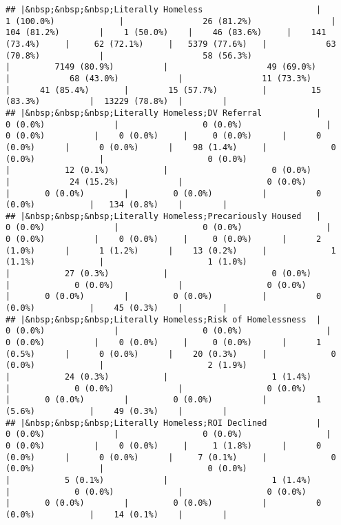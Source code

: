 \documentclass[
]{article}
\begin{document}
\begin{verbatim}
## |&nbsp;&nbsp;&nbsp;Literally Homeless                       |             1 (100.0%)             |                26 (81.2%)                |        104 (81.2%)        |    1 (50.0%)    |    46 (83.6%)     |    141 (73.4%)     |     62 (72.1%)     |   5379 (77.6%)   |            63 (70.8%)            |                    58 (56.3%)                    |         7149 (80.9%)          |                    49 (69.0%)                     |            68 (43.0%)            |                11 (73.3%)                 |      41 (85.4%)       |        15 (57.7%)         |         15 (83.3%)          |  13229 (78.8%)  |        |
## |&nbsp;&nbsp;&nbsp;Literally Homeless;DV Referral           |              0 (0.0%)              |                 0 (0.0%)                 |         0 (0.0%)          |    0 (0.0%)     |     0 (0.0%)      |      0 (0.0%)      |      0 (0.0%)      |    98 (1.4%)     |             0 (0.0%)             |                     0 (0.0%)                     |           12 (0.1%)           |                     0 (0.0%)                      |            24 (15.2%)            |                 0 (0.0%)                  |       0 (0.0%)        |         0 (0.0%)          |          0 (0.0%)           |   134 (0.8%)    |        |
## |&nbsp;&nbsp;&nbsp;Literally Homeless;Precariously Housed   |              0 (0.0%)              |                 0 (0.0%)                 |         0 (0.0%)          |    0 (0.0%)     |     0 (0.0%)      |      2 (1.0%)      |      1 (1.2%)      |    13 (0.2%)     |             1 (1.1%)             |                     1 (1.0%)                     |           27 (0.3%)           |                     0 (0.0%)                      |             0 (0.0%)             |                 0 (0.0%)                  |       0 (0.0%)        |         0 (0.0%)          |          0 (0.0%)           |    45 (0.3%)    |        |
## |&nbsp;&nbsp;&nbsp;Literally Homeless;Risk of Homelessness  |              0 (0.0%)              |                 0 (0.0%)                 |         0 (0.0%)          |    0 (0.0%)     |     0 (0.0%)      |      1 (0.5%)      |      0 (0.0%)      |    20 (0.3%)     |             0 (0.0%)             |                     2 (1.9%)                     |           24 (0.3%)           |                     1 (1.4%)                      |             0 (0.0%)             |                 0 (0.0%)                  |       0 (0.0%)        |         0 (0.0%)          |          1 (5.6%)           |    49 (0.3%)    |        |
## |&nbsp;&nbsp;&nbsp;Literally Homeless;ROI Declined          |              0 (0.0%)              |                 0 (0.0%)                 |         0 (0.0%)          |    0 (0.0%)     |     1 (1.8%)      |      0 (0.0%)      |      0 (0.0%)      |     7 (0.1%)     |             0 (0.0%)             |                     0 (0.0%)                     |           5 (0.1%)            |                     1 (1.4%)                      |             0 (0.0%)             |                 0 (0.0%)                  |       0 (0.0%)        |         0 (0.0%)          |          0 (0.0%)           |    14 (0.1%)    |        |

\end{verbatim}
\end{document}
